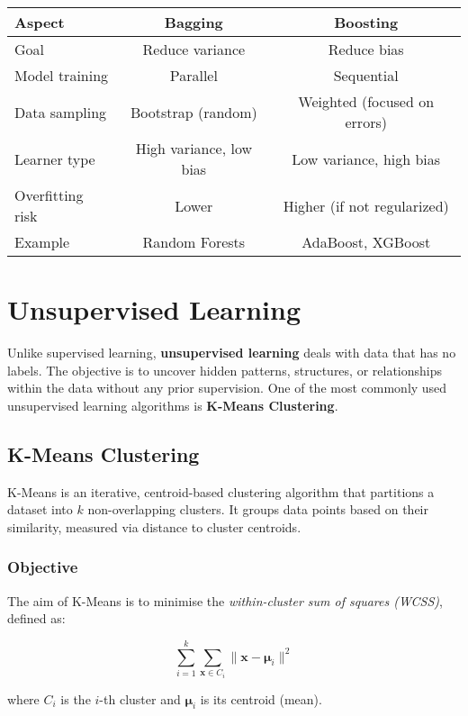 \documentclass[9pt]{extarticle}
\begin{document}
\begin{table}[H]
\centering
\begin{tabular}{|l|c|c|}
\hline
\textbf{Aspect} & \textbf{Bagging} & \textbf{Boosting} \\
\hline
Goal & Reduce variance & Reduce bias \\
Model training & Parallel & Sequential \\
Data sampling & Bootstrap (random) & Weighted (focused on errors) \\
Learner type & High variance, low bias & Low variance, high bias \\
Overfitting risk & Lower & Higher (if not regularized) \\
Example & Random Forests & AdaBoost, XGBoost \\
\hline
\end{tabular}
\end{table}


\section{Unsupervised Learning}

Unlike supervised learning, \textbf{unsupervised learning} deals with data that has no labels. The objective is to uncover hidden patterns, structures, or relationships within the data without any prior supervision. One of the most commonly used unsupervised learning algorithms is \textbf{K-Means Clustering}.

\subsection{K-Means Clustering}

K-Means is an iterative, centroid-based clustering algorithm that partitions a dataset into $k$ non-overlapping clusters. It groups data points based on their similarity, measured via distance to cluster centroids.

\subsubsection{Objective}

The aim of K-Means is to minimise the \textit{within-cluster sum of squares (WCSS)}, defined as:

\[
\sum_{i=1}^k \sum_{\mathbf{x} \in C_i} \lVert \mathbf{x} - \boldsymbol{\mu}_i \rVert^2
\]

where $C_i$ is the $i$-th cluster and $\boldsymbol{\mu}_i$ is its centroid (mean).
\end{document}
